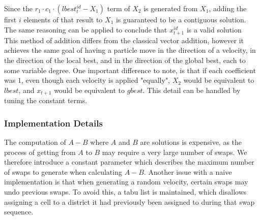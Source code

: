 \documentclass[journal]{IEEEtran}
\begin{document}
Since the $r_1 \cdot c_1 \cdot (lbest_{t}^{id} - X_1)$ term of $X_2$ is
generated from $X_1$, adding the first $i$ elements of that result to $X_1$ is
guaranteed to be a contiguous solution.  The same reasoning can be applied to
conclude that $x_{t + 1}^{id}$ is a valid solution\\

This method of addition differs from the classical vector addition, however it
achieves the same goal of having a particle move in the direction of a velocity,
in the direction of the local best, and in the direction of the global best,
each to some variable degree.  One important difference to note, is that if each
coefficient was $1$, even though each velocity is applied "equally", $X_2$ would
be equivalent to $lbest$, and $x_{t + 1}$ would be equivalent to $gbest$.  This
detail can be handled by tuning the constant terms.\\

\subsubsection{Implementation Details}
The computation of $A - B$ where $A$ and $B$ are solutions is expensive, as the
process of getting from $A$ to $B$ may require a very large number of swaps.  We
therefore introduce a constant parameter which describes the maximum number of
swaps to generate when calculating $A - B$.  Another issue with a naive
implementation is that when generating a random velocity, certain swaps may undo
previous swaps.  To avoid this, a tabu list is maintained, which disallows
assigning a cell to a district it had previously been assigned to during that
swap sequence.\\
\end{document}
